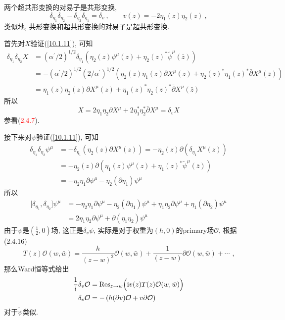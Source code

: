 两个超共形变换的对易子是共形变换,
\begin{equation}
    \delta_{\eta_{1}}\delta_{\eta_{2}}-\delta_{\eta_{2}}\delta_{\eta_{1}}=\delta_{v}\:,\qquad
    v(z)= -2\eta_{1}(z)\eta_{2}(z) \:, \label{10.1.11}
\end{equation}
类似地, 共形变换和超共形变换的对易子是超共形变换.
\begin{tcolorbox}
首先对$ X $验证(\ref{10.1.11}), 可知
\begin{align*}
    \delta_{\eta_{1}}\delta_{\eta_{2}}X &=  (\alpha^{\prime}/2)^{1/2}
    \delta_{\eta_{1}}(\eta_{2}(z)\psi^{\mu}(z) + \eta_{2}(z)^{\ast} \tilde{\psi}^{\mu}(\bar{z})) \\
    &=-(\alpha^{\prime}/2)^{1/2} (2/\alpha^{\prime})^{1/2}
    (\eta_{2}(z)\eta_{1}(z)\partial X^{\mu}(z) + \eta_{2}(z)^{\ast} \eta_{1}(z)^{\ast}\bar{\partial}X^{\mu}(\bar{z}))  \\
    &=
    \eta_{1}(z)\eta_{2}(z)\partial X^{\mu}(z) +
    \eta_{1}(z)^{\ast} \eta_{2}(z)^{\ast}\bar{\partial}X^{\mu}(\bar{z})
\end{align*}
所以
\begin{equation*}
    [\delta_{\eta_{1}},\delta_{\eta_{2}}]X= 
     2\eta_{1}\eta_{2}\partial X^{\mu} + 2\eta_{1}^{\ast} \eta_{2}^{\ast}\bar{\partial}X^{\mu}
     =\delta_{v}X
\end{equation*}
参看(\textcolor{red}{2.4.7}).

接下来对$ \psi $验证(\ref{10.1.11}),
可知\begin{align*}
\delta _{\eta _{1}}\delta _{\eta _{2}}\psi ^{\mu } &=-\delta _{\eta
_{1}}\left( \eta _{2}(z)\partial X^{\mu }(z)\right) =-\eta _{2}(z)\partial
(\delta _{\eta _{1}}X^{\mu }(z)) \\
&=-\eta _{2}(z)\partial (\eta _{1}(z)\psi ^{\mu }(z)+\eta _{1}(z)^{\ast }%
\tilde{\psi}^{\mu }(\bar{z})) \\
&=-\eta _{2}\eta _{1}\partial \psi ^{\mu }-\eta _{2}(\partial \eta
_{1})\psi ^{\mu }
\end{align*}%
所以\begin{align*}
\lbrack \delta _{\eta _{1}},\delta _{\eta _{2}}]\psi ^{\mu } &=-\eta
_{2}\eta _{1}\partial \psi ^{\mu }-\eta _{2}(\partial \eta _{1})\psi ^{\mu
}+\eta _{1}\eta _{2}\partial \psi ^{\mu }+\eta _{1}(\partial \eta _{2})\psi
^{\mu } \\
&=2\eta _{1}\eta _{2}\partial \psi ^{\mu }+\partial (\eta _{1}\eta
_{2})\psi ^{\mu }
\end{align*}%
由于$\psi $是$(\frac{1}{2},0)$场, 这正是$\delta _{v}\psi $, 实际是对于权重为$(h,0)$的primary场$\mathcal{O}$, 根据(2.4.16)%
\[
T(z)\mathcal{O}(w,\bar{w})=\frac{h}{(z-w)^{2}}\mathcal{O}(w,\bar{w})+\frac{1}{(z-w)}\partial \mathcal{O}(w,%
\bar{w})+\cdots \text{ ,}
\]%
那么Ward恒等式给出\begin{align*}
\frac{1}{\mi }\delta _{v}\mathcal{O} &=\operatorname{Res}_{z\to w}\Bigl(\mi v(z)T(z)\mathcal{O}(w,%
\bar{w})\Bigr) \\
\delta _{v}\mathcal{O} &=-\left( h(\partial v)\mathcal{O}+v\partial \mathcal{O}\right)
\end{align*}
对于$ \tilde{\psi} $类似.


\end{tcolorbox}
